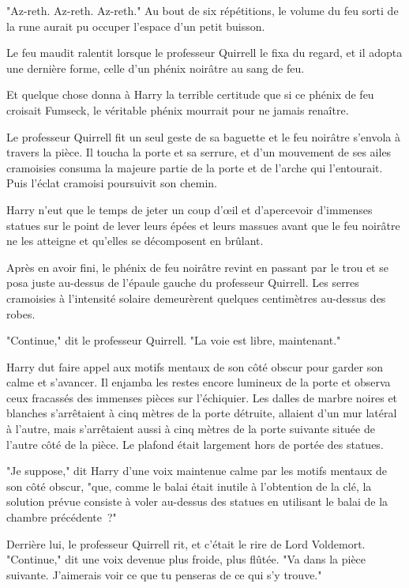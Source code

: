 "Az-reth. Az-reth. Az-reth." Au bout de six répétitions, le volume du feu sorti de la rune aurait pu occuper l'espace d'un petit buisson.

Le feu maudit ralentit lorsque le professeur Quirrell le fixa du regard, et il adopta une dernière forme, celle d'un phénix noirâtre au sang de feu.

Et quelque chose donna à Harry la terrible certitude que si ce phénix de feu croisait Fumseck, le véritable phénix mourrait pour ne jamais renaître.

Le professeur Quirrell fit un seul geste de sa baguette et le feu noirâtre s'envola à travers la pièce. Il toucha la porte et sa serrure, et d'un mouvement de ses ailes cramoisies consuma la majeure partie de la porte et de l'arche qui l'entourait. Puis l'éclat cramoisi poursuivit son chemin.

Harry n'eut que le temps de jeter un coup d'œil et d'apercevoir d'immenses statues sur le point de lever leurs épées et leurs massues avant que le feu noirâtre ne les atteigne et qu'elles se décomposent en brûlant.

Après en avoir fini, le phénix de feu noirâtre revint en passant par le trou et se posa juste au-dessus de l'épaule gauche du professeur Quirrell. Les serres cramoisies à l'intensité solaire demeurèrent quelques centimètres au-dessus des robes.

"Continue," dit le professeur Quirrell. "La voie est libre, maintenant."

Harry dut faire appel aux motifs mentaux de son côté obscur pour garder son calme et s'avancer. Il enjamba les restes encore lumineux de la porte et observa ceux fracassés des immenses pièces sur l'échiquier. Les dalles de marbre noires et blanches s'arrêtaient à cinq mètres de la porte détruite, allaient d'un mur latéral à l'autre, mais s'arrêtaient aussi à cinq mètres de la porte suivante située de l'autre côté de la pièce. Le plafond était largement hors de portée des statues.

"Je suppose," dit Harry d'une voix maintenue calme par les motifs mentaux de son côté obscur, "que, comme le balai était inutile à l'obtention de la clé, la solution prévue consiste à voler au-dessus des statues en utilisant le balai de la chambre précédente~?"

Derrière lui, le professeur Quirrell rit, et c'était le rire de Lord Voldemort. "Continue," dit une voix devenue plus froide, plus flûtée. "Va dans la pièce suivante. J'aimerais voir ce que tu penseras de ce qui s'y trouve."

